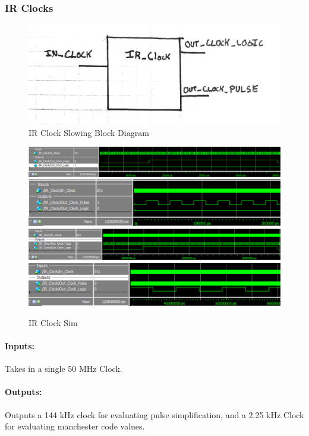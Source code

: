 \documentclass[]{article}
\begin{document}
\subsubsection{IR Clocks}
\begin{figure}[H]\centering
    \includegraphics[width=0.9\linewidth]{figures/IR_Clock_Block.jpg}
    \caption{IR Clock Slowing Block Diagram}
    \label{fig:irClockBlock}
\end{figure}
\begin{figure}[H]\centering
    \includegraphics[width=\linewidth]{figures/IR_Clock_Sim1}
    \includegraphics[width=\linewidth]{figures/IR_Clock_Sim2}
    \includegraphics[width=\linewidth]{figures/IR_Clock_Sim3}
    \includegraphics[width=\linewidth]{figures/IR_Clock_Sim4}
    \caption{IR Clock Sim}
    \label{fig:asyncIRData}
\end{figure}
\paragraph{Inputs:} Takes in a single 50 MHz Clock.
\paragraph{Outputs:} Outputs a 144 kHz clock for evaluating pulse simplification, and a 2.25 kHz Clock for evaluating manchester code values.
\end{document}
